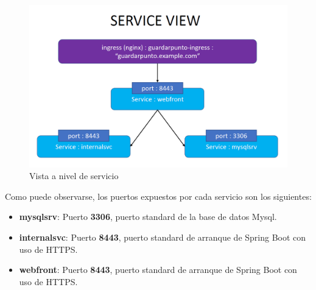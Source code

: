 \documentclass[12pt,spanish]{article}
\begin{document}
\begin{center}
 \begin{figure}[H]
 \begin{center}
   \includegraphics[width=18cm]{img/serviceView00.png}
   \caption{Vista a nivel de servicio}
   \label{fig:serviceView00}
 \end{center}
 \end{figure}
\end{center}

Como puede observarse, los puertos expuestos por cada servicio son los siguientes:

\begin{itemize}
\item{\textbf{mysqlsrv}}: Puerto \textbf{3306}, puerto standard de la base de datos Mysql.
\item{\textbf{internalsvc}}: Puerto \textbf{8443}, puerto standard de arranque de Spring Boot con uso de HTTPS.
\item{\textbf{webfront}}: Puerto \textbf{8443}, puerto standard de arranque de Spring Boot con uso de HTTPS.
\end{itemize}
\end{document}
